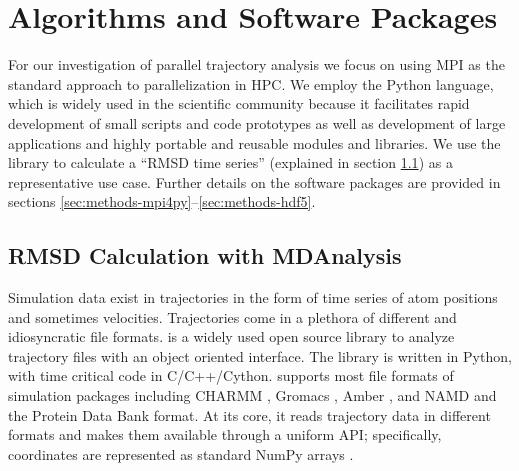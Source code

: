 
\section{Algorithms and Software Packages}
\label{sec:packages}

For our investigation of parallel trajectory analysis we focus on using MPI as the standard approach to parallelization in HPC.
We employ the Python language, which is widely used in the scientific community because it facilitates rapid development of small scripts and code prototypes as well as development of large applications and highly portable and reusable modules and libraries.
We use the  library to calculate a ``RMSD time series'' (explained in section \ref{sec:mda}) as a representative use case.
Further details on the software packages are provided in sections \ref{sec:methods-mpi4py}--\ref{sec:methods-hdf5}.


\subsection{RMSD Calculation with MDAnalysis}
\label{sec:mda}

Simulation data exist in trajectories in the form of time series of atom positions and sometimes velocities.
Trajectories come in a plethora of different and idiosyncratic file formats. 
 \cite{Gowers:2016aa, Michaud-Agrawal:2011fu} is a widely used open source library to analyze trajectory files with an object oriented interface. 
The library is written in Python, with time critical code in C/C++/Cython. 
 supports most file formats of simulation packages including CHARMM \cite{Brooks:2009pt}, Gromacs \cite{Abraham:2015aa}, Amber \cite{Case:2005uq}, and NAMD \cite{Phillips:2005ek} and the Protein Data Bank \cite{Burley:2018aa} format.
At its core, it reads trajectory data in different formats and makes them available through a uniform API; specifically, coordinates are represented as standard NumPy arrays \cite{Van-Der-Walt:2011aa}.



